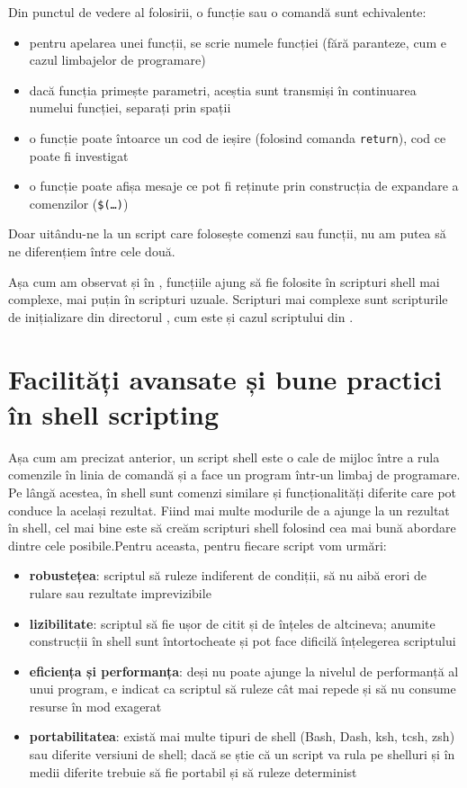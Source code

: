 Din punctul de vedere al folosirii, o funcție sau o comandă sunt echivalente:
\begin{itemize}
  \item pentru apelarea unei funcții, se scrie numele funcției (fără paranteze, cum e cazul limbajelor de programare)
  \item dacă funcția primește parametri, aceștia sunt transmiși în continuarea numelui funcției, separați prin spații
  \item o funcție poate întoarce un cod de ieșire (folosind comanda \texttt{return}), cod ce poate fi investigat
  \item o funcție poate afișa mesaje ce pot fi reținute prin construcția de expandare a comenzilor (\texttt{\$(\ldots)})
\end{itemize}
Doar uitându-ne la un script care folosește comenzi sau funcții, nu am putea să ne diferențiem între cele două.

Așa cum am observat și în , funcțiile ajung să fie folosite în scripturi shell mai complexe, mai puțin în scripturi uzuale.
Scripturi mai complexe sunt scripturile de inițializare din directorul , cum este și cazul scriptului  din .

\section{Facilități avansate și bune practici în shell scripting}
\label{sec:auto:script-advanced}

Așa cum am precizat anterior, un script shell este o cale de mijloc între a rula comenzile în linia de comandă și a face un program într-un limbaj de programare.
Pe lângă acestea, în shell sunt comenzi similare și funcționalități diferite care pot conduce la același rezultat.
Fiind mai multe modurile de a ajunge la un rezultat în shell, cel mai bine este să creăm scripturi shell folosind cea mai bună abordare dintre cele posibile.Pentru aceasta, pentru fiecare script vom urmări:

\begin{itemize}
  \item \textbf{robustețea}: scriptul să ruleze indiferent de condiții, să nu aibă erori de rulare sau rezultate imprevizibile
  \item \textbf{lizibilitate}: scriptul să fie ușor de citit și de înțeles de altcineva; anumite construcții în shell sunt întortocheate și pot face dificilă înțelegerea scriptului
  \item \textbf{eficiența și performanța}: deși nu poate ajunge la nivelul de performanță al unui program, e indicat ca scriptul să ruleze cât mai repede și să nu consume resurse în mod exagerat
  \item \textbf{portabilitatea}: există mai multe tipuri de shell (Bash, Dash, ksh, tcsh, zsh) sau diferite versiuni de shell; dacă se știe că un script va rula pe shelluri și în medii diferite trebuie să fie portabil și să ruleze determinist
\end{itemize}

